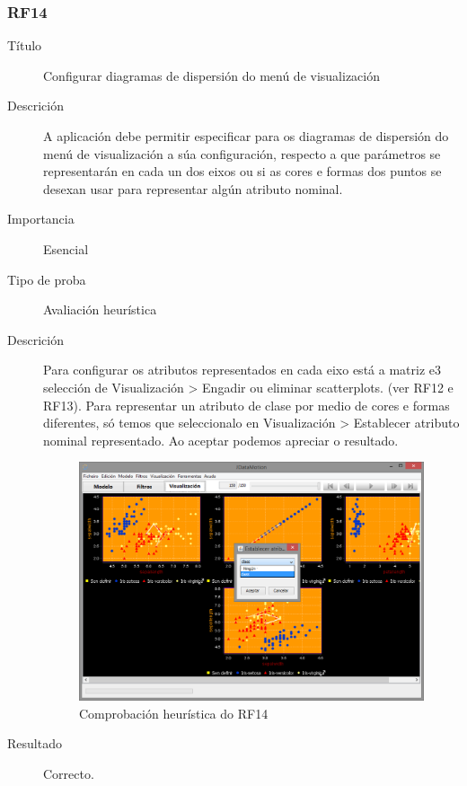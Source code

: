 \subsubsection*{RF14}
\begin{description}
\item[Título] \hfill
Configurar diagramas de dispersión do menú de visualización
\item[Descrición] \hfill
A aplicación debe permitir especificar para os diagramas de dispersión do menú de visualización a súa configuración, respecto a que parámetros se representarán en cada un dos eixos ou si as cores e formas dos puntos se desexan usar para representar algún atributo nominal.
\item[Importancia] \hfill
Esencial
\item[Tipo de proba] \hfill
Avaliación heurística
\item[Descrición]
Para configurar os atributos representados en cada eixo está a matriz e3 selección de Visualización \textgreater{} Engadir ou eliminar scatterplots. (ver RF12 e RF13). Para representar un atributo de clase por medio de cores e formas diferentes, só temos que seleccionalo en Visualización \textgreater{} Establecer atributo nominal representado. Ao aceptar podemos apreciar o resultado.
\begin{figure}
\centering
\includegraphics[width=\textwidth,height=\textheight,keepaspectratio]{figuras/RF14}
\caption{Comprobación heurística do RF14}
\label{RF14}
\end{figure}
\item[Resultado]
Correcto.
\end{description}

